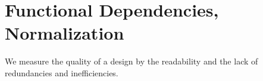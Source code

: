 \documentclass[english]{exam}
\begin{document}
	
    \section{Functional Dependencies, Normalization}
    
    We measure the quality of a design by the readability and the lack of redundancies and inefficiencies.
     
\end{document}
